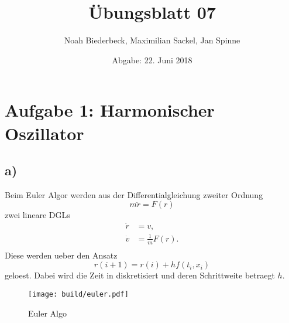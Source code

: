 \documentclass{scrartcl}
\title{Übungsblatt 07}
\author{%
		Noah Biederbeck, Maximilian Sackel, Jan Spinne
}
\date{Abgabe: 22. Juni 2018}
\begin{document}
\maketitle
\section*{Aufgabe 1: Harmonischer Oszillator}
\subsection*{a)}
Beim Euler Algor werden aus der Differentialgleichung zweiter Ordnung
\begin{equation}
		m \ddot{r} = F(r)
\end{equation}
zwei lineare DGLs
\begin{eqnarray}
		\dot{r} &= v,  \\
		\dot{v} &= \frac{1}{m} F(r). \\ 
\end{eqnarray}
Diese werden ueber den Ansatz 
\begin{equation}
		r(i+1) = r(i) + h f(t_i, x_i)
\end{equation}
geloest. Dabei wird die Zeit in diskretisiert und deren Schrittweite 
betraegt $h$.
\begin{figure}[ht]
		\centering
		\texttt{[image: build/euler.pdf]}
		\caption{Euler Algo}
		\label{fig:euler}
\end{figure}
\end{document}
